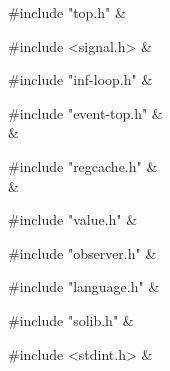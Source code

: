 \medskip
\begin{cxreftabi}
{\stt \#include "top.h"} &\\
\end{cxreftabi}

\medskip
\begin{cxreftabi}
{\stt \#include <signal.h>} &\\
\end{cxreftabi}

\medskip
\begin{cxreftabi}
{\stt \#include "inf-loop.h"} &\\
\end{cxreftabi}

\medskip
\begin{cxreftabi}
{\stt \#include "event-top.h"} &\\
\hspace*{0.2in}{\stt \#include <signal.h>} &\\
\end{cxreftabi}

\medskip
\begin{cxreftabi}
{\stt \#include "regcache.h"} &\\
\hspace*{0.2in}{\stt \#include "../include/ansidecl.h"} &\\
\end{cxreftabi}

\medskip
\begin{cxreftabi}
{\stt \#include "value.h"} &\\
\end{cxreftabi}

\medskip
\begin{cxreftabi}
{\stt \#include "observer.h"} &\\
\end{cxreftabi}

\medskip
\begin{cxreftabi}
{\stt \#include "language.h"} &\\
\end{cxreftabi}

\medskip
\begin{cxreftabi}
{\stt \#include "solib.h"} &\\
\end{cxreftabi}

\medskip
\begin{cxreftabi}
{\stt \#include <stdint.h>} &\\
\end{cxreftabi}

